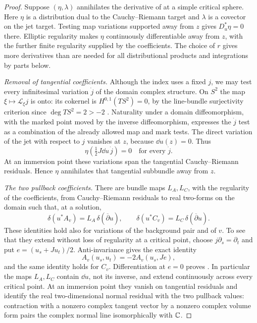 \begin{proof}
Suppose $(\eta,\lambda)$ annihilates the derivative of
 at a simple critical sphere.
Here $\eta$ is a distribution dual to the Cauchy--Riemann target and
$\lambda$ is a covector on the jet target.  Testing map variations
supported away from $z$ gives $D_u^*\eta=0$ there.  Elliptic
regularity makes $\eta$ continuously differentiable away from $z$,
with the further finite regularity supplied by the coefficients.
The choice of $r$ gives more derivatives than are needed for all
distributional products and integrations by parts below.

\emph{Removal of tangential coefficients.}
Although the index uses a fixed $j$, we may test every infinitesimal
variation $\dot j$ of the domain complex structure.  On $S^2$ the map
$\xi\mapsto\mathcal L_\xi j$ is onto: its cokernel is
$H^{0,1}(TS^2)=0$, by the line-bundle surjectivity criterion since
$\deg TS^2=2>-2$ \cite[Theorem~3.23]{Wendl2014Lectures}.
Naturality under a domain diffeomorphism, with the
marked point moved by the inverse diffeomorphism, expresses the
$\dot j$ test as a combination of the already allowed map and mark
tests.  The direct variation of the jet with respect to $j$ vanishes
at $z$, because $\dd u(z)=0$.  Thus
\[
 \eta\left(\tfrac12J\dd u\,\dot j\right)=0
 \quad\text{for every }\dot j.
\]
At an immersion point these variations span the tangential
Cauchy--Riemann residuals.  Hence $\eta$ annihilates that tangential
subbundle away from $z$.

\emph{The two pullback coefficients.}
There are bundle maps $L_A,L_C$, with the regularity of the coefficients,
from Cauchy--Riemann residuals
to real two-forms on the domain such that, at a solution,
\begin{equation}\label{eq:pencil-pullback-linearization}
 \delta(u^*A_v)=L_A\,\delta(\overline\partial u),\qquad
 \delta(u^*C_v)=L_C\,\delta(\overline\partial u).
\end{equation}
These identities hold also for variations of the background pair and
of $v$.  To see that they extend without loss of regularity at a critical point, choose
$j\partial_s=\partial_t$ and put
$e=(u_s+Ju_t)/2$.  Anti-invariance gives the exact identity
\[
 A_v(u_s,u_t)=-2A_v(u_s,Je),
\]
and the same identity holds for $C_v$.  Differentiation at $e=0$
proves .  In particular the
maps $L_A,L_C$ contain $\dd u$, not its inverse, and extend continuously
across every critical point.  At an immersion point they vanish on
tangential residuals and identify the real two-dimensional normal
residual with the two pullback values: contraction with a nonzero
complex tangent vector by a nonzero complex volume form pairs the
complex normal line isomorphically with $\mathbb C$.


\end{proof}
